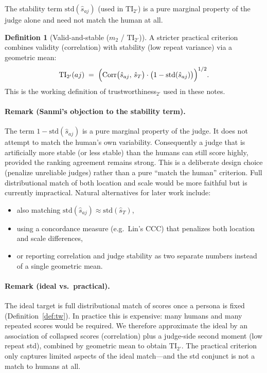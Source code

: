 \documentclass{article}
\theoremstyle{definition}
\newtheorem{definition}{Definition}
\theoremstyle{remark}
\newcommand{\TI}{\mathrm{TI}}
\begin{document}
The stability term \(\mathrm{std}(\hat s_{aj})\) (used in \(\TI_{2'}\)) is a pure marginal property of the judge alone and need not match the human at all.

\begin{definition}[Valid-and-stable (\(m_2\) / \(\TI_{2'}\))]
A stricter practical criterion combines validity (correlation) with stability (low repeat variance) via a geometric mean:
\[
\TI_{2'}(aj) \;=\; \Bigl(\mathrm{Corr}\bigl(\hat s_{aj},\, \hat s_T\bigr) \cdot \bigl(1 - \mathrm{std}(\hat s_{aj})\bigr)\Bigr)^{1/2}.
\]
This is the working definition of trustworthiness\({}_{2'}\) used in these notes.
\end{definition}

\paragraph{Remark (Sanmi's objection to the stability term).}
The term \(1 - \mathrm{std}(\hat s_{aj})\) is a pure marginal property of the judge.
It does not attempt to match the human's own variability.
Consequently a judge that is artificially more stable (or less stable) than the humans can still score highly, provided the ranking agreement remains strong.
This is a deliberate design choice (penalize unreliable judges) rather than a pure ``match the human'' criterion.
Full distributional match of both location and scale would be more faithful but is currently impractical.
Natural alternatives for later work include:
\begin{itemize}
  \item also matching \(\mathrm{std}(\hat s_{aj}) \approx \mathrm{std}(\hat s_T)\),
  \item using a concordance measure (e.g.\ Lin's CCC) that penalizes both location and scale differences,
  \item or reporting correlation and judge stability as two separate numbers instead of a single geometric mean.
\end{itemize}

\paragraph{Remark (ideal vs.\ practical).}
The ideal target is full distributional match of scores once a persona is fixed (Definition~\ref{def:tw}).
In practice this is expensive: many humans and many repeated scores would be required.
We therefore approximate the ideal by an association of collapsed scores (correlation) plus a judge-side second moment (low repeat std), combined by geometric mean to obtain \(\TI_{2'}\).
The practical criterion only captures limited aspects of the ideal match---and the std conjunct is not a match to humans at all.
\end{document}
